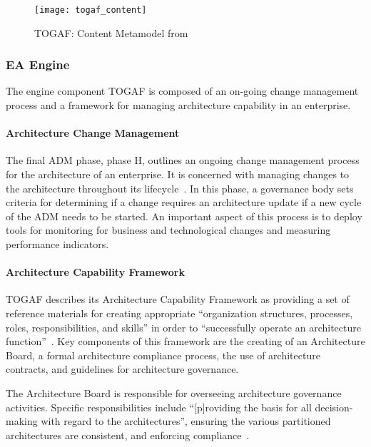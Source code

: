 \begin{figure}
\centering
\texttt{[image: togaf\_content]}
\caption{TOGAF: Content Metamodel from \cite[Sec. 34.2]{togaf9.1}}
\label{fig:togaf_content}
\end{figure}

\subsubsection{EA Engine}

The engine component TOGAF is composed of an on-going change management process and a framework for managing architecture capability in an enterprise.

\paragraph*{Architecture Change Management}

The final ADM phase, phase H, outlines an ongoing change management process for the architecture of an enterprise.  It is concerned with managing changes to the architecture throughout its lifecycle~\cite[Ch. 16]{togaf9.1}. In this phase, a governance body sets criteria for determining if a change requires an architecture update if a new cycle of the ADM needs to be started. An important aspect of this process is to deploy tools for monitoring for business and technological changes and measuring performance indicators. 

\paragraph*{Architecture Capability Framework}

TOGAF describes its Architecture Capability Framework as providing a set of reference materials for creating appropriate ``organization structures, processes, roles, responsibilities, and skills'' in order to ``successfully operate an architecture function''~\cite[Sec. 45.1]{togaf9.1}. Key components of this framework are the creating of an Architecture Board, a formal architecture compliance process, the use of architecture contracts, and guidelines for architecture governance. 

The Architecture Board is responsible for overseeing architecture governance activities. Specific responsibilities include ``[p]roviding the basis for all decision-making with regard to the architectures'', ensuring the various partitioned architectures are consistent, and enforcing compliance~\cite[Ch. 47]{togaf9.1}. 

